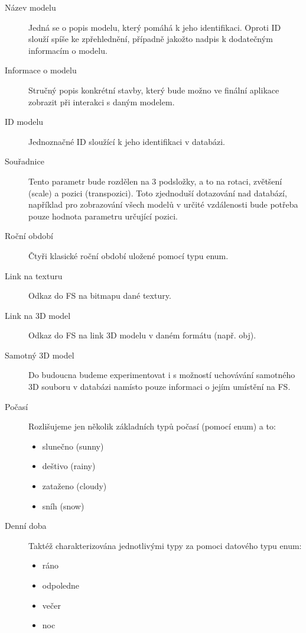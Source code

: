 \documentclass[thesis=B,czech]{FITthesis}[2012/06/26]
\begin{document}
	\begin{description}
		\item[Název modelu]
			Jedná se o popis modelu, který pomáhá k jeho identifikaci. Oproti ID slouží spíše ke zpřehlednění, případně jakožto nadpis k dodatečným informacím o modelu.

		\item[Informace o modelu]
			Stručný popis konkrétní stavby, který bude možno ve finální aplikace zobrazit při interakci s daným modelem.

		\item[ID modelu]
			Jednoznačné ID sloužící k jeho identifikaci v databázi.

		\item[Souřadnice]
			Tento parametr bude rozdělen na 3 podsložky, a to na rotaci, zvětšení (scale) a pozici (transpozici). Toto zjednoduší dotazování nad databází, například pro zobrazování všech modelů v určité vzdálenosti bude potřeba pouze hodnota parametru určující pozici.
			
		\item[Roční období]
			Čtyři klasické roční období uložené pomocí typu enum.

		\item[Link na texturu]
			Odkaz do FS na bitmapu dané textury.

		\item[Link na 3D model]
			Odkaz do FS na link 3D modelu v daném formátu (např. obj).

		\item[Samotný 3D model]
			Do budoucna budeme experimentovat i s možností uchovávání samotného 3D souboru v databázi namísto pouze informaci o jejím umístění na FS.
			
		\item[Počasí]
			Rozlišujeme jen několik základních typů počasí (pomocí enum) a to:

	    	\begin{itemize}
    			\item slunečno (sunny)
    			\item deštivo (rainy)
    			\item zataženo (cloudy)
    			\item sníh (snow)
    		\end{itemize}

		\item[Denní doba]
			Taktéž charakterizována jednotlivými typy za pomoci datového typu enum:
	    	\begin{itemize}
    			\item ráno
    			\item odpoledne
    			\item večer
    			\item noc
    		\end{itemize}
			
	\end{description}
	
\end{document}
